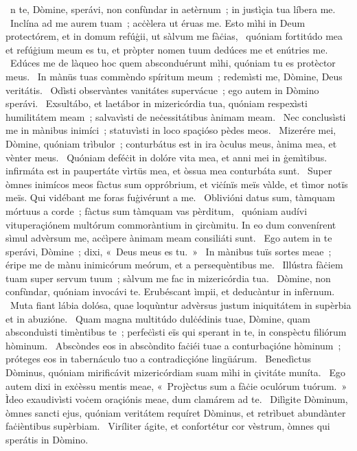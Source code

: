 { }
{%
~n te, Dòmine, sperávi, non confùndar in aetèrnum~; in justìçia tua líbera me. 
~Inclína ad me aurem tuam~; acċèlera ut éruas me. Esto mìhi in Deum protectórem, et in domum refúġii, ut sàlvum me fàċias, 
~quóniam fortitúdo mea et refúġium meum es tu, et pròpter nomen tuum dedúces me et enútries me. 
~Edúces me de làqueo hoc quem absconduérunt mìhi, quóniam tu es protèctor meus. 
~In mànüs tuas commèndo spíritum meum~; redemìsti me, Dòmine, Deus veritátis. 
~Odìsti observàntes vanitátes supervácue~; ego autem in Dòmino sperávi. 
~Exsultábo, et laetábor in mizericórdia tua, quóniam respexìsti humilitátem meam~; salvavìsti de neċessitátibus ànimam meam. 
~Nec conclusìsti me in mànibus inimíci~; statuvìsti in loco spaçióso pèdes meos. 
~Mizerére mei, Dòmine, quóniam trìbulor~; conturbátus est in ira òculus meus, ànima mea, et vènter meus. 
~Quóniam deféċit in dolóre vita mea, et anni mei in ġemìtibus. infirmáta est in paupertáte vìrtüs mea, et òssua mea conturbáta sunt. 
~Super òmnes inimícos meos fàctus sum oppróbrium, et viċínïs meïs vàlde, et tìmor notïs meïs. Qui vidébant me foras fuġivérunt a me. 
~Oblivióni datus sum, tàmquam mórtuus a corde~; fàctus sum tàmquam vas pèrditum, 
~quóniam audívi vituperaçiónem multórum commoràntium in çircùmitu. In eo dum convenírent sìmul advèrsum me, acċìpere ànimam meam consiliáti sunt. 
~Ego autem in te sperávi, Dòmine~; dixi, «~Deus meus es tu.~»
~In mànibus tuïs sortes meae~; éripe me de mànu inimicórum meórum, et a persequèntibus me. 
~Illústra fàċiem tuam super servum tuum~; sàlvum me fac in mizericórdia tua. 
~Dòmine, non confùndar, quóniam invocávi te. Erubéscant ìmpii, et deducàntur in infèrnum. 
~Muta fiant lábia dolósa, quae loquùntur advèrsus justum iniquitátem in supèrbia et in abuzióne. 
~Quam magna multitúdo dulċédinis tuae, Dòmine, quam absconduìsti timèntibus te~; perfeċìsti eïs qui sperant in te, in conspèctu filiórum hòminum. 
~Abscòndes eos in abscòndito faċiéi tuae a conturbaçióne hòminum~; próteges eos in tabernáculo tuo a contradicçióne lingüárum. 
~Benedìctus Dòminus, quóniam mirificávit mizericórdiam suam mìhi in çivitáte muníta. 
~Ego autem dixi in exċèssu mentis meae, «~Projèctus sum a fàċie oculórum tuórum.~» Ìdeo exaudivìsti voċem oraçiónis meae, dum clamárem ad te. 
~Dilìgite Dòminum, òmnes sancti ejus, quóniam veritátem requíret Dòminus, et retrìbuet abundànter faċièntibus supèrbiam. 
~Viríliter ágite, et confortétur cor vèstrum, òmnes qui sperátis in Dòmino. 
}
